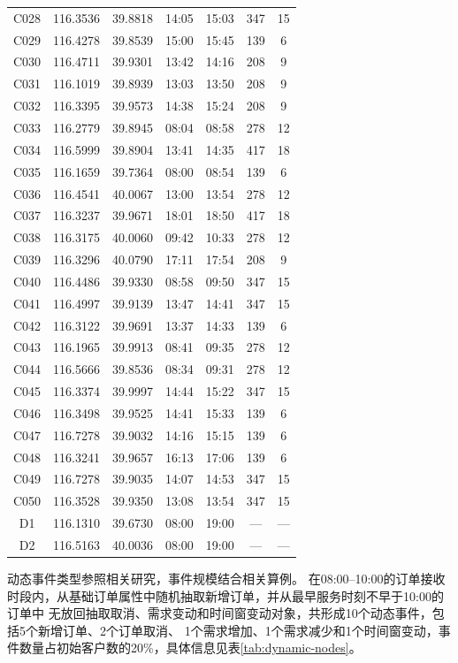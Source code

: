 \documentclass{setp-new}
\begin{document}
\begin{supertabular*}{\textwidth}{@{\extracolsep{\fill}}ccccccc@{}}
C028 & 116.3536 & 39.8818 & 14:05 & 15:03 & 347 & 15\\
C029 & 116.4278 & 39.8539 & 15:00 & 15:45 & 139 & 6\\
C030 & 116.4711 & 39.9301 & 13:42 & 14:16 & 208 & 9\\
C031 & 116.1019 & 39.8939 & 13:03 & 13:50 & 208 & 9\\
C032 & 116.3395 & 39.9573 & 14:38 & 15:24 & 208 & 9\\
C033 & 116.2779 & 39.8945 & 08:04 & 08:58 & 278 & 12\\
C034 & 116.5999 & 39.8904 & 13:41 & 14:35 & 417 & 18\\
C035 & 116.1659 & 39.7364 & 08:00 & 08:54 & 139 & 6\\
C036 & 116.4541 & 40.0067 & 13:00 & 13:54 & 278 & 12\\
C037 & 116.3237 & 39.9671 & 18:01 & 18:50 & 417 & 18\\
C038 & 116.3175 & 40.0060 & 09:42 & 10:33 & 278 & 12\\
C039 & 116.3296 & 40.0790 & 17:11 & 17:54 & 208 & 9\\
C040 & 116.4486 & 39.9330 & 08:58 & 09:50 & 347 & 15\\
C041 & 116.4997 & 39.9139 & 13:47 & 14:41 & 347 & 15\\
C042 & 116.3122 & 39.9691 & 13:37 & 14:33 & 139 & 6\\
C043 & 116.1965 & 39.9913 & 08:41 & 09:35 & 278 & 12\\
C044 & 116.5666 & 39.8536 & 08:34 & 09:31 & 278 & 12\\
C045 & 116.3374 & 39.9997 & 14:44 & 15:22 & 347 & 15\\
C046 & 116.3498 & 39.9525 & 14:41 & 15:33 & 139 & 6\\
C047 & 116.7278 & 39.9032 & 14:16 & 15:15 & 139 & 6\\
C048 & 116.3241 & 39.9657 & 16:13 & 17:06 & 139 & 6\\
C049 & 116.7278 & 39.9035 & 14:07 & 14:53 & 347 & 15\\
C050 & 116.3528 & 39.9350 & 13:08 & 13:54 & 347 & 15\\
D1 & 116.1310 & 39.6730 & 08:00 & 19:00 & --- & ---\\
D2 & 116.5163 & 40.0036 & 08:00 & 19:00 & --- & ---\\
\end{supertabular*}
\tablefirsthead{}\tablehead{}\tabletail{}\tablelasttail{}
\endgroup

动态事件类型参照相关研究\cite{ref:71}，事件规模结合相关算例\cite{ref:51}。
在08:00--10:00的订单接收时段内，从基础订单属性中随机抽取新增订单，并从最早服务时刻不早于10:00的订单中
无放回抽取取消、需求变动和时间窗变动对象，共形成10个动态事件，包括5个新增订单、2个订单取消、
1个需求增加、1个需求减少和1个时间窗变动，事件数量占初始客户数的20\%，具体信息见表\ref{tab:dynamic-nodes}。
\end{document}
